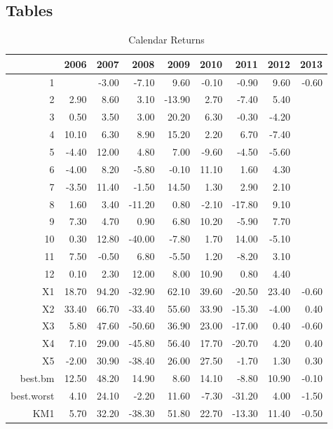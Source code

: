 \documentclass{article}
\begin{document}
\subsection{Tables}
\begin{table}[ht]
\begin{center}
\caption{Calendar Returns}
\begin{tabular}{rrrrrrrrr}
  \hline
 & 2006 & 2007 & 2008 & 2009 & 2010 & 2011 & 2012 & 2013 \\ 
  \hline
1 &  & -3.00 & -7.10 & 9.60 & -0.10 & -0.90 & 9.60 & -0.60 \\ 
  2 & 2.90 & 8.60 & 3.10 & -13.90 & 2.70 & -7.40 & 5.40 &  \\ 
  3 & 0.50 & 3.50 & 3.00 & 20.20 & 6.30 & -0.30 & -4.20 &  \\ 
  4 & 10.10 & 6.30 & 8.90 & 15.20 & 2.20 & 6.70 & -7.40 &  \\ 
  5 & -4.40 & 12.00 & 4.80 & 7.00 & -9.60 & -4.50 & -5.60 &  \\ 
  6 & -4.00 & 8.20 & -5.80 & -0.10 & 11.10 & 1.60 & 4.30 &  \\ 
  7 & -3.50 & 11.40 & -1.50 & 14.50 & 1.30 & 2.90 & 2.10 &  \\ 
  8 & 1.60 & 3.40 & -11.20 & 0.80 & -2.10 & -17.80 & 9.10 &  \\ 
  9 & 7.30 & 4.70 & 0.90 & 6.80 & 10.20 & -5.90 & 7.70 &  \\ 
  10 & 0.30 & 12.80 & -40.00 & -7.80 & 1.70 & 14.00 & -5.10 &  \\ 
  11 & 7.50 & -0.50 & 6.80 & -5.50 & 1.20 & -8.20 & 3.10 &  \\ 
  12 & 0.10 & 2.30 & 12.00 & 8.00 & 10.90 & 0.80 & 4.40 &  \\ 
  X1 & 18.70 & 94.20 & -32.90 & 62.10 & 39.60 & -20.50 & 23.40 & -0.60 \\ 
  X2 & 33.40 & 66.70 & -33.40 & 55.60 & 33.90 & -15.30 & -4.00 & 0.40 \\ 
  X3 & 5.80 & 47.60 & -50.60 & 36.90 & 23.00 & -17.00 & 0.40 & -0.60 \\ 
  X4 & 7.10 & 29.00 & -45.80 & 56.40 & 17.70 & -20.70 & 4.20 & 0.40 \\ 
  X5 & -2.00 & 30.90 & -38.40 & 26.00 & 27.50 & -1.70 & 1.30 & 0.30 \\ 
  best.bm & 12.50 & 48.20 & 14.90 & 8.60 & 14.10 & -8.80 & 10.90 & -0.10 \\ 
  best.worst & 4.10 & 24.10 & -2.20 & 11.60 & -7.30 & -31.20 & 4.00 & -1.50 \\ 
  KM1 & 5.70 & 32.20 & -38.30 & 51.80 & 22.70 & -13.30 & 11.40 & -0.50 \\ 
   \hline
\end{tabular}
\end{center}
\end{table}%
\end{document}
